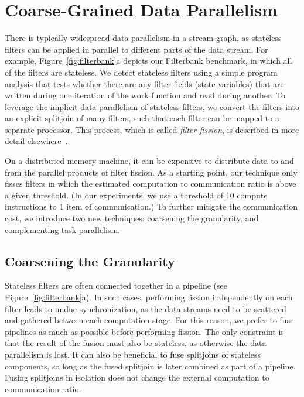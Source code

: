 \begin{figure*}[t]
\begin{center}
\end{center}
\caption{FilterBank benchmark. Only one pipeline of the outer split-join is shown, rest are identical pipelines. \label{fig:filterbank}}
\end{figure*}


\section{Coarse-Grained Data Parallelism}

There is typically widespread data parallelism in a stream graph, as
stateless filters can be applied in parallel to different parts of the
data stream.  For example, Figure~\ref{fig:filterbank}a depicts
our Filterbank benchmark, in which all of the filters are stateless.
We detect stateless filters using a simple program analysis that tests
whether there are any filter fields (state variables) that are written
during one iteration of the work function and read during another.  To
leverage the implicit data parallelism of stateless filters, we
convert the filters into an explicit splitjoin of many filters, such
that each filter can be mapped to a separate processor.  This process,
which is called {\it filter fission}, is described in more detail
elsewhere~\cite{streamit-asplos}.

On a distributed memory machine, it can be expensive to distribute
data to and from the parallel products of filter fission.  As a
starting point, our technique only fisses filters in which the
estimated computation to communication ratio is above a given
threshold.  (In our experiments, we use a threshold of 10 compute
instructions to 1 item of communication.)  To further mitigate the
communication cost, we introduce two new techniques: coarsening the
granularity, and complementing task parallelism.

\subsection{Coarsening the Granularity}

Stateless filters are often connected together in a pipeline (see
Figure~\ref{fig:filterbank}a).  In such cases, performing fission
independently on each filter leads to undue synchronization, as the
data streams need to be scattered and gathered between each
computation stage.  For this reason, we prefer to fuse pipelines as
much as possible before performing fission.  The only constraint is
that the result of the fusion must also be stateless, as otherwise the
data parallelism is lost.  It can also be beneficial to fuse
splitjoins of stateless components, so long as the fused splitjoin is
later combined as part of a pipeline.  Fusing splitjoins in isolation
does not change the external computation to communication ratio.

